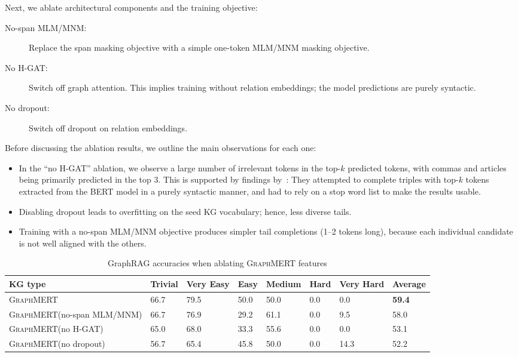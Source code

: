 \documentclass[10pt]{article}
\newcommand{\ours}{\textsc{GraphMERT}\xspace}
\begin{document}
Next, we ablate architectural components and the training objective:
\begin{description}
    \item[No-span MLM/MNM:] Replace the span masking objective with a simple one-token MLM/MNM masking objective.
    \item[No H-GAT:] Switch off graph attention. This implies training without relation embeddings; the model predictions are purely syntactic. 
    \item[No dropout:] Switch off dropout on relation embeddings.
\end{description}

Before discussing the ablation results, we outline the main observations for each one:
\begin{itemize}
    \item In the ``no H-GAT'' ablation, we observe a large number of irrelevant tokens in the top-$k$ predicted tokens, with commas and articles being primarily predicted in the top 3. This is supported by findings by~\citet{Silva_entailment}:  They attempted to complete triples with top-$k$ tokens extracted from the BERT model in a purely syntactic manner, and had to rely on a stop word list to make the results usable.
    \item Disabling dropout leads to overfitting on the seed KG vocabulary; hence, less diverse tails.
    \item Training with a no-span MLM/MNM objective produces simpler tail completions (1--2 tokens long), because each individual candidate is not well aligned with the others. 
\end{itemize}


\begin{table}[t]
  \centering
  \caption{GraphRAG accuracies when ablating \ours features}
  \label{tab:graphrag-components}
  \small
  \begingroup
  \setlength{\tabcolsep}{6pt}
  \begin{tabular}{l p{0.9cm} p{0.8cm} p{0.8cm} p{1.2cm} p{0.8cm} p{0.8cm} p{1.1cm}}
    \toprule
    \rowcolor{gray!30}
    \textbf{KG type} & \textbf{Trivial} & \textbf{Very Easy} & \textbf{Easy} & \textbf{Medium} & \textbf{Hard} & \textbf{Very Hard} & \textbf{Average} \\
    \midrule
    \ours & 66.7 & 79.5 & 50.0 & 50.0 & 0.0 & 0.0 & \textbf{59.4} \\
    \midrule
    \ours (no-span MLM/MNM) & 66.7 & 76.9 & 29.2 & 61.1 & 0.0 & 9.5 & 58.0 \\   
    \ours (no H-GAT)  & 65.0 & 68.0 & 33.3 & 55.6 & 0.0 & 0.0 & 53.1\\
    \ours (no dropout) & 56.7 & 65.4 & 45.8 & 50.0 & 0.0 & 14.3 & 52.2 \\   
    \bottomrule
  \end{tabular}
  \endgroup
\end{table}
\end{document}
